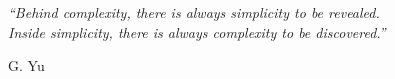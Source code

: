 

\epigraph{\textit{``Behind complexity, there is always simplicity to be revealed. \\
Inside simplicity, there is always complexity to be discovered.''}}{\textmd{G. Yu} \cite{Yu2004a}}

